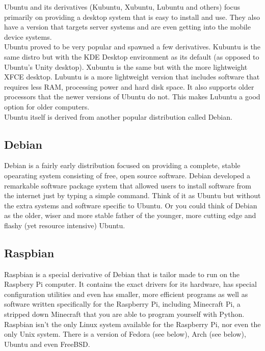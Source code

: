 Ubuntu and its derivatives (Kubuntu, Xubuntu, Lubuntu and others) focus primarily on providing a desktop system that is easy to install and use.  They also have a version that targets server systems and are even getting into the mobile device systems.\\

Ubuntu proved to be very popular and spawned a few derivatives.  Kubuntu is the same distro but with the KDE Desktop environment as its default (as opposed to Ubuntu's Unity desktop).  Xubuntu is the same but with the more lightweight XFCE desktop.  Lubuntu is a more lightweight version that includes software that requires less RAM, processing power and hard disk space.  It also supports older processors that the newer versions of Ubuntu do not.  This makes Lubuntu a good option for older computers.\\

Ubuntu itself is derived from another popular distribution called Debian.

\subsection{Debian}

Debian is a fairly early distribution focused on providing a complete, stable opearating system consisting of free, open source software.  Debian developed a remarkable software package system that allowed users to install software from the internet just by typing a simple command.  Think of it as Ubuntu but without the extra systems and software specific to Ubuntu.  Or you could think of Debian as the older, wiser and more stable father of the younger, more cutting edge and flashy (yet resource intensive) Ubuntu.

\subsection{Raspbian}

Raspbian is a special derivative of Debian that is tailor made to run on the Raspbery Pi computer.  It contains the exact drivers for its hardware, has special configuration utilities and even has smaller, more efficient programs as well as software written specifically for the Raspberry Pi, including Minecraft Pi, a stripped down Minecraft that you are able to program yourself with Python.\\

Raspbian isn't the only Linux system available for the Raspberry Pi, nor even the only Unix system.  There is a version of Fedora (see below), Arch (see below), Ubuntu and even FreeBSD.

